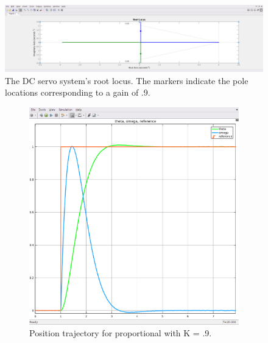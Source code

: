 \documentclass[11pt,a4paper]{article}
\begin{document}
\begin{figure}[!htbp]
	\includegraphics[width=\textwidth]{imglab/lab4sol_constantrloc.png}
	\caption{The DC servo system's root locus. The markers indicate the pole locations corresponding to a gain of .9.}
\end{figure}



\begin{figure}[!htbp]
	\centering
	\begin{subfigure}{.5\textwidth}
		\centering
		\includegraphics[width = \textwidth]{imglab/lab4sol_constanttraj.png}
		\caption{Position trajectory for proportional with K = .9.}
	\end{subfigure}%
	\begin{subfigure}{.5\textwidth}
		\centering

\end{subfigure}
\end{figure}
\end{document}
